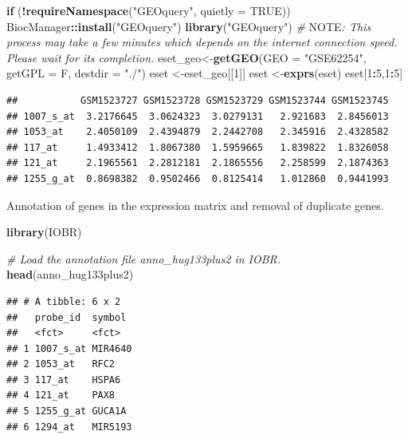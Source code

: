 \documentclass[
  12pt,
]{book}
\newenvironment{Shaded}{\begin{snugshade}}{\end{snugshade}}
\newcommand{\AlertTok}[1]{\textcolor[rgb]{0.94,0.16,0.16}{#1}}
\newcommand{\AttributeTok}[1]{\textcolor[rgb]{0.13,0.29,0.53}{#1}}
\newcommand{\CommentTok}[1]{\textcolor[rgb]{0.56,0.35,0.01}{\textit{#1}}}
\newcommand{\ConstantTok}[1]{\textcolor[rgb]{0.56,0.35,0.01}{#1}}
\newcommand{\ControlFlowTok}[1]{\textcolor[rgb]{0.13,0.29,0.53}{\textbf{#1}}}
\newcommand{\DecValTok}[1]{\textcolor[rgb]{0.00,0.00,0.81}{#1}}
\newcommand{\FunctionTok}[1]{\textcolor[rgb]{0.13,0.29,0.53}{\textbf{#1}}}
\newcommand{\NormalTok}[1]{#1}
\newcommand{\OtherTok}[1]{\textcolor[rgb]{0.56,0.35,0.01}{#1}}
\newcommand{\SpecialCharTok}[1]{\textcolor[rgb]{0.81,0.36,0.00}{\textbf{#1}}}
\newcommand{\StringTok}[1]{\textcolor[rgb]{0.31,0.60,0.02}{#1}}
\theoremstyle{definition}
\theoremstyle{definition}
\theoremstyle{definition}
\theoremstyle{definition}
\theoremstyle{remark}
\begin{document}
\begin{Shaded}
\begin{Highlighting}[]
\ControlFlowTok{if}\NormalTok{ (}\SpecialCharTok{!}\FunctionTok{requireNamespace}\NormalTok{(}\StringTok{"GEOquery"}\NormalTok{, }\AttributeTok{quietly =} \ConstantTok{TRUE}\NormalTok{))  BiocManager}\SpecialCharTok{::}\FunctionTok{install}\NormalTok{(}\StringTok{"GEOquery"}\NormalTok{)}
\FunctionTok{library}\NormalTok{(}\StringTok{"GEOquery"}\NormalTok{)}
\CommentTok{\# }\AlertTok{NOTE}\CommentTok{: This process may take a few minutes which depends on the internet connection speed. Please wait for its completion.}
\NormalTok{eset\_geo}\OtherTok{\textless{}{-}}\FunctionTok{getGEO}\NormalTok{(}\AttributeTok{GEO     =} \StringTok{"GSE62254"}\NormalTok{, }\AttributeTok{getGPL  =}\NormalTok{ F, }\AttributeTok{destdir =} \StringTok{"./"}\NormalTok{)}
\NormalTok{eset    }\OtherTok{\textless{}{-}}\NormalTok{eset\_geo[[}\DecValTok{1}\NormalTok{]]}
\NormalTok{eset    }\OtherTok{\textless{}{-}}\FunctionTok{exprs}\NormalTok{(eset)}
\NormalTok{eset[}\DecValTok{1}\SpecialCharTok{:}\DecValTok{5}\NormalTok{,}\DecValTok{1}\SpecialCharTok{:}\DecValTok{5}\NormalTok{]}
\end{Highlighting}
\end{Shaded}

\begin{verbatim}
##           GSM1523727 GSM1523728 GSM1523729 GSM1523744 GSM1523745
## 1007_s_at  3.2176645  3.0624323  3.0279131   2.921683  2.8456013
## 1053_at    2.4050109  2.4394879  2.2442708   2.345916  2.4328582
## 117_at     1.4933412  1.8067380  1.5959665   1.839822  1.8326058
## 121_at     2.1965561  2.2812181  2.1865556   2.258599  2.1874363
## 1255_g_at  0.8698382  0.9502466  0.8125414   1.012860  0.9441993
\end{verbatim}

Annotation of genes in the expression matrix and removal of duplicate genes.

\begin{Shaded}
\begin{Highlighting}[]
\FunctionTok{library}\NormalTok{(IOBR)}

\CommentTok{\# Load the annotation file \textasciigrave{}anno\_hug133plus2\textasciigrave{} in IOBR.}
\FunctionTok{head}\NormalTok{(anno\_hug133plus2)}
\end{Highlighting}
\end{Shaded}

\begin{verbatim}
## # A tibble: 6 x 2
##   probe_id  symbol 
##   <fct>     <fct>  
## 1 1007_s_at MIR4640
## 2 1053_at   RFC2   
## 3 117_at    HSPA6  
## 4 121_at    PAX8   
## 5 1255_g_at GUCA1A 
## 6 1294_at   MIR5193
\end{verbatim}
\end{document}
